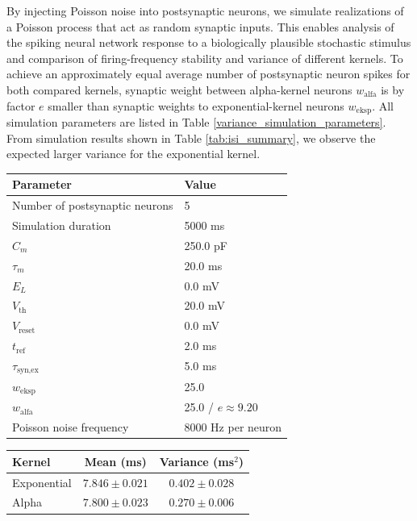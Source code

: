 \documentclass[a4paper,12pt,openright]{book}
\let\oldtable\table
\let\endoldtable\endtable
\renewenvironment{table}[1][htbp] %
{
    \oldtable[#1]
    \footnotesize                     %
}
{
    \endoldtable
}
\begin{document}
By injecting Poisson noise into postsynaptic neurons, we simulate realizations of a Poisson process that act as random synaptic inputs. This enables analysis of the spiking neural network response to a biologically plausible stochastic stimulus and comparison of firing-frequency stability and variance of different kernels.
\newpage
\noindent To achieve an approximately equal average number of postsynaptic neuron spikes for both compared kernels, synaptic weight between alpha-kernel neurons $w_{\text{alfa}}$ is by factor $e$ smaller than synaptic weights to exponential-kernel neurons $w_{\text{eksp}}$. All simulation parameters are listed in Table \ref{variance_simulation_parameters}. From simulation results shown in Table \ref{tab:isi_summary}, we observe the expected larger variance for the exponential kernel.

\begin{table}[htbp]
\centering
\begin{tabular}{ll}
\hline
\textbf{Parameter} & \textbf{Value} \\
\hline
Number of postsynaptic neurons & 5 \\
Simulation duration & 5000 ms \\
$C_m$ & 250.0 pF \\
$\tau_m$ & 20.0 ms \\
$E_L$ & 0.0 mV \\
$V_\text{th}$ & 20.0 mV \\
$V_\text{reset}$ & 0.0 mV \\
$t_\text{ref}$ & 2.0 ms \\
$\tau_\text{syn,ex}$ & 5.0 ms \\
$w_{\text{eksp}}$ & 25.0 \\
$w_{\text{alfa}}$ & 25.0 / $e \approx 9.20$ \\
Poisson noise frequency & 8000 Hz per neuron \\
\hline
\end{tabular}
\caption{Simulation parameters used for comparing neuron models.}
\label{variance_simulation_parameters}
\end{table}

\begin{table}[htbp]
\centering
\begin{tabular}{lcc}
\hline
Kernel & Mean (ms) & Variance (ms$^2$) \\
\hline
Exponential & \(7.846 \pm 0.021\) & \(\mathbf{0.402 \pm 0.028} \) \\
Alpha       & \(7.800 \pm 0.023\) & \(\mathbf{0.270 \pm 0.006} \) \\
\hline
\end{tabular}
\caption{Summary statistics of interspike intervals for neurons with alpha and exponential kernels. Mean and standard deviation are computed over all postsynaptic neurons.}
\label{tab:isi_summary}
\end{table}
\newpage
\end{document}
